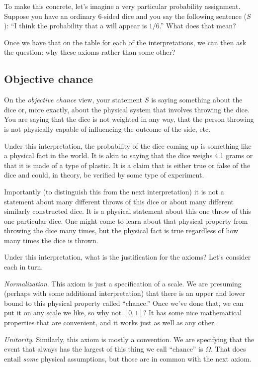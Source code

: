 To make this concrete, let's imagine a very particular probability assignment.  Suppose you have an ordinary 6-sided dice and you say the following sentence ($S$): ``I think the probability that a  will appear is $1/6$.''  What does that mean?

Once we have that on the table for each of the interpretations, we can then ask the question: why these axioms rather than some other?

\subsection{Objective chance}

On the {\it objective chance} view, your statement $S$ is saying something about the dice or, more exactly, about the physical system that involves throwing the dice.  You are saying that the dice is not weighted in any way, that the person throwing is not physically capable of influencing the outcome of the side, etc.  

Under this interpretation, the probability of the dice coming up  is something like a physical fact in the world.  It is akin to saying that the dice weighs 4.1 grams or that it is made of a type of plastic. It is a claim that is either true or false of the dice and could, in theory, be verified by some type of experiment.

Importantly (to distinguish this from the next interpretation) it is not a statement about many different throws of this dice or about many different similarly constructed dice.  It is a physical statement about this one throw of this one particular dice.  One might come to learn about that physical property from throwing the dice many times, but the physical fact is true regardless of how many times the dice is thrown.

Under this interpretation, what is the justification for the axioms?  Let's consider each in turn.

{\it Normalization}.  This axiom is just a specification of a scale.  We are presuming (perhaps with some additional interpretation) that there is an upper and lower bound to this physical property called ``chance.''  Once we've done that, we can put it on any scale we like, so why not $[0,1]$?  It has some nice mathematical properties that are convenient, and it works just as well as any other.

{\it Unitarity}.  Similarly, this axiom is mostly a convention.  We are specifying that the event that always has the largest of this thing we call ``chance'' is $\Omega$. That does entail {\it some} physical assumptions, but those are in common with the next axiom.

